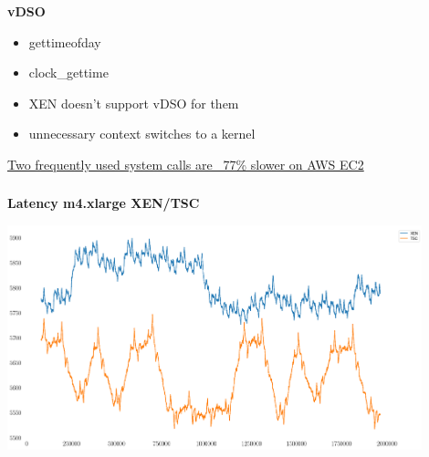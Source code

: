 \documentclass[usenames,dvipsnames, 18pt, compress, aspectratio=169]{beamer}
\begin{document}
\begin{frame}
    \frametitle{}
    \begin{center}
    \textbf{vDSO}

        \begin{itemize}[label={\MVRightarrow}]
            \item gettimeofday
            \item clock\_gettime
            \item XEN doesn't support vDSO for them
            \item unnecessary context switches to a kernel
        \end{itemize}

        \normalsize{\href{
            https://blog.packagecloud.io/eng/2017/03/08/system-calls-are-much-slower-on-ec2/
        }{Two frequently used system calls are ~77\% slower on AWS EC2}}
    \end{center}
\end{frame}

\begin{frame}
    \frametitle{}
    \begin{center}
    \textbf{Latency m4.xlarge XEN/TSC}

        \includegraphics[width=0.9\textwidth,center]{m4_clock_source.png}

    \end{center}
\end{frame}
\end{document}
